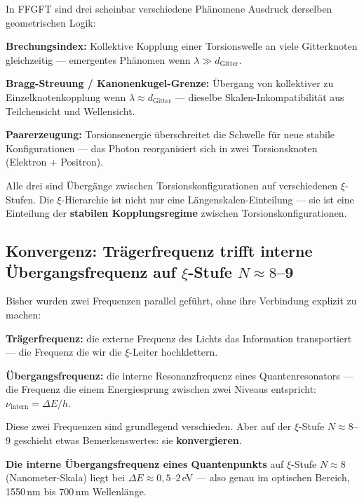 \begin{foundation}
In FFGFT sind drei scheinbar verschiedene Phänomene
Ausdruck derselben geometrischen Logik:

\textbf{Brechungsindex:}
Kollektive Kopplung einer Torsionswelle an
viele Gitterknoten gleichzeitig ---
emergentes Phänomen wenn $\lambda \gg d_\text{Gitter}$.

\textbf{Bragg-Streuung / Kanonenkugel-Grenze:}
Übergang von kollektiver zu Einzelknotenkopplung
wenn $\lambda \approx d_\text{Gitter}$ ---
dieselbe Skalen-Inkompatibilität
aus Teilchensicht und Wellensicht.

\textbf{Paarerzeugung:}
Torsionsenergie überschreitet die Schwelle
für neue stabile Konfigurationen ---
das Photon reorganisiert sich in
zwei Torsionsknoten (Elektron + Positron).

Alle drei sind Übergänge zwischen
Torsionskonfigurationen auf verschiedenen
$\xi$-Stufen. Die $\xi$-Hierarchie ist nicht
nur eine Längenskalen-Einteilung ---
sie ist eine Einteilung der
\textbf{stabilen Kopplungsregime}
zwischen Torsionskonfigurationen.
\end{foundation}

\subsection{Konvergenz: Trägerfrequenz trifft interne
  Übergangsfrequenz auf \texorpdfstring{$\xi$}{xi}-Stufe
  \texorpdfstring{$N \approx 8$--9}{N≈8-9}}
\label{sec:konvergenz}

Bisher wurden zwei Frequenzen parallel geführt,
ohne ihre Verbindung explizit zu machen:

\textbf{Trägerfrequenz:} die externe Frequenz des Lichts
das Information transportiert ---
die Frequenz die wir die $\xi$-Leiter hochklettern.

\textbf{Übergangsfrequenz:} die interne Resonanzfrequenz
eines Quantenresonators --- die Frequenz
die einem Energiesprung zwischen zwei Niveaus
entspricht: $\nu_\text{intern} = \Delta E / h$.

Diese zwei Frequenzen sind grundlegend verschieden.
Aber auf der $\xi$-Stufe $N \approx 8$--9
geschieht etwas Bemerkenswertes: sie \textbf{konvergieren}.

\medskip
\textbf{Die interne Übergangsfrequenz eines Quantenpunkts}
auf $\xi$-Stufe $N \approx 8$ (Nanometer-Skala)
liegt bei $\Delta E \approx 0{,}5$--2\,eV ---
also genau im optischen Bereich,
1550\,nm bis 700\,nm Wellenlänge.

